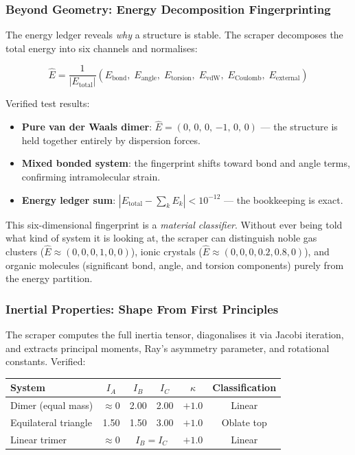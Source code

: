 \documentclass[11pt, a4paper, oneside]{article}
\theoremstyle{definition}
\theoremstyle{remark}
\begin{document}
\subsubsection{Beyond Geometry: Energy Decomposition Fingerprinting}

The energy ledger reveals \textit{why} a structure is stable.  The
scraper decomposes the total energy into six channels and normalises:

\begin{equation}
\hat{E} = \frac{1}{|E_{\text{total}}|}
  (E_{\text{bond}},\; E_{\text{angle}},\; E_{\text{torsion}},\;
   E_{\text{vdW}},\; E_{\text{Coulomb}},\; E_{\text{external}})
\end{equation}

Verified test results:
\begin{itemize}
  \item \textbf{Pure van der Waals dimer}: $\hat{E} = (0,\, 0,\, 0,\, {-1},\, 0,\, 0)$
        — the structure is held together entirely by dispersion forces.
  \item \textbf{Mixed bonded system}: the fingerprint shifts toward
        bond and angle terms, confirming intramolecular strain.
  \item \textbf{Energy ledger sum}: $|E_{\text{total}} - \sum_k E_k| < 10^{-12}$ —
        the bookkeeping is exact.
\end{itemize}

This six-dimensional fingerprint is a \textit{material classifier}.
Without ever being told what kind of system it is looking at, the
scraper can distinguish noble gas clusters ($\hat{E} \approx (0,0,0,1,0,0)$),
ionic crystals ($\hat{E} \approx (0,0,0,0.2,0.8,0)$), and organic
molecules (significant bond, angle, and torsion components) purely
from the energy partition.

\subsubsection{Inertial Properties: Shape From First Principles}

The scraper computes the full inertia tensor, diagonalises it via
Jacobi iteration, and extracts principal moments, Ray's asymmetry
parameter, and rotational constants.  Verified:

\begin{center}
\begin{tabular}{lccccc}
\toprule
System & $I_A$ & $I_B$ & $I_C$ & $\kappa$ & Classification \\
\midrule
Dimer (equal mass) & $\approx 0$ & 2.00 & 2.00 & $+1.0$ & Linear \\
Equilateral triangle & 1.50 & 1.50 & 3.00 & $+1.0$ & Oblate top \\
Linear trimer & $\approx 0$ & \multicolumn{2}{c}{$I_B = I_C$} & $+1.0$ & Linear \\
\bottomrule
\end{tabular}
\end{center}
\end{document}
